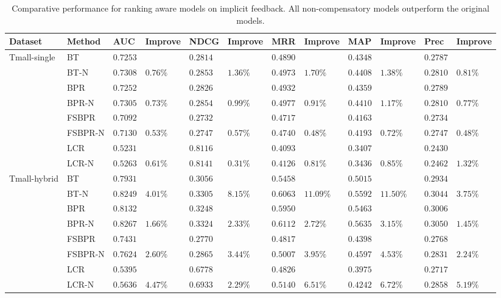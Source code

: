 \documentclass[letterpaper]{article} %
\begin{document}
\begin{table}[ht]
\tiny
\caption{Comparative performance for ranking aware models on implicit feedback.  All non-compensatory models outperform the original models.}%
\begin{center}
\begin{tabular}{p{1.2cm}<{\centering}|p{1.2cm}<{\centering} |p{0.5cm} p{0.6cm} |p{0.5cm} p{0.6cm} |p{0.5cm} p{0.6cm}|p{0.5cm} p{0.6cm} |p{0.5cm} p{0.6cm}}
\hline
Dataset	& Method	& AUC	& Improve&	NDCG&	Improve&	MRR	&Improve &	MAP&	Improve&	Prec	&Improve\\\hline
\multirow{6}{*}{Tmall-single} &	BT	& $0.7253 $&  &$0.2814$& &$0.4890$&   &$0.4348$& 	& $0.2787$ 	&\\
	&BT-N	&$0.7308$ &	$0.76\%$	&$0.2853 $	&$1.36\%$	&$0.4973$ &	$1.70\%$	&$0.4408$ &	$1.38\%$	&$0.2810 $	&$0.81\%$\\
	&BPR&	$0.7252$ 	&&	$0.2826$ 	&&	$0.4932$ & &$0.4359$& 	& $0.2789$ 	&\\
	&BPR-N	&$0.7305$ 	&$0.73\%$	&$0.2854$ &	$0.99\%$	&$0.4977$ 	&$0.91\%$ &$0.4410$ &	$1.17\%$	&$0.2810 $	&$0.77\%$	\\
	&FSBPR		&$0.7092$&	&$0.2732$ 	&&	$0.4717$& &$0.4163$& 	& $0.2734$ 	&\\	
	&FSBPR-N	&$0.7130$	&$0.53\%$	&	$0.2747$ 	&$0.57\%$	&$0.4740$ 	&$0.48\%$ &$0.4193$ &	$0.72\%$	&$0.2747 $	&$0.48\%$	\\
	&LCR		&$0.5231 $&	&$0.8116 $ 	&&	$0.4093 $& &$0.3407 $& 	& $0.2430 $ 	&\\	
	&LCR-N	&$0.5263 $	&$0.61\%$	&	$0.8141$ 	&$0.31\%$	&$0.4126$ 	&$0.81\%$ &$0.3436$ &	$0.85\%$	&$0.2462 $	&$1.32\%$\\

	\hline
\multirow{6}{*}{Tmall-hybrid}	&	BT	& $0.7931 $&  &$0.3056$& &$0.5458$&   &$0.5015$& 	& $0.2934$ 	&\\
	&BT-N	&$0.8249$ &	$4.01\%$	&$0.3305 $	&$8.15\%$	&$0.6063$ &	$11.09\%$	&$0.5592$ &	$11.50\%$	&$0.3044 $	&$3.75\%$\\
	&BPR&	$0.8132$ 	&&	$0.3248$ 	&&	$0.5950$ & &$0.5463$& 	& $0.3006$ 	&\\
	&BPR-N	&$0.8267$ 	&$1.66\%$	&$0.3324$ &	$2.33\%$	&$0.6112$ 	&$2.72\%$ &$0.5635$ &	$3.15\%$	&$0.3050 $	&$1.45\%$	\\
	&FSBPR		&$0.7431$&	&$0.2770$ 	&&	$0.4817$& &$0.4398$& 	& $0.2768$ 	&\\	
	&FSBPR-N	&$0.7624$	&$2.60\%$	&	$0.2865$ 	&$3.44\%$	&$0.5007$ 	&$3.95\%$ &$0.4597$ &	$4.53\%$	&$0.2831 $	&$2.24\%$	\\
	&LCR		&$0.5395$&	&$0.6778$ 	&&	$0.4826$& &$0.3975$& 	& $0.2717$ 	&\\	
	&LCR-N	&$0.5636$	&$4.47\%$	&	$0.6933$ 	&$2.29\%$	&$0.5140$ 	&$6.51\%$ &$0.4242$ &	$6.72\%$	&$0.2858 $	&$5.19\%$\\


\end{tabular}
\end{center}
\end{table}
\end{document}
